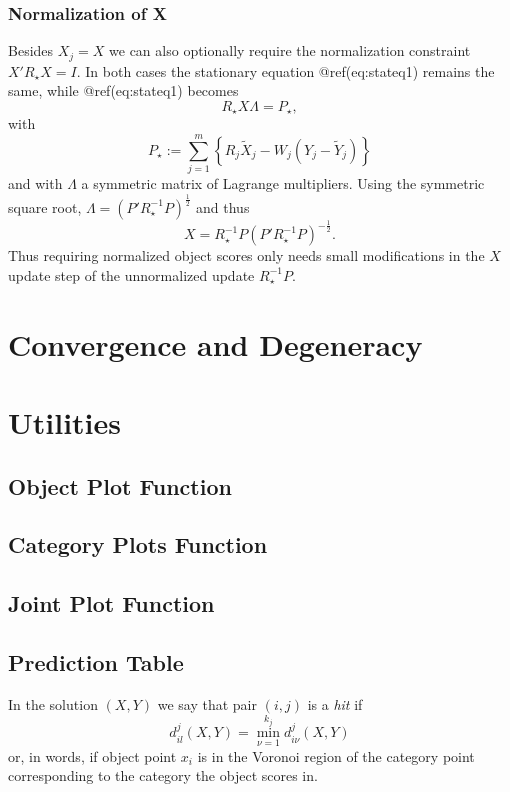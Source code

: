 \documentclass[
  12pt,
  letterpaper,
  DIV=11,
  numbers=noendperiod]{scrartcl}
\begin{document}
\subsubsection{Normalization of X}\label{normalization-of-x}

Besides \(X_j=X\) we can also optionally require the normalization
constraint \(X'R_\star X=I\). In both cases the stationary equation
@ref(eq:stateq1) remains the same, while @ref(eq:stateq1) becomes \[
R_\star X\Lambda=P_\star,
\] with \[
P_\star:=\sum_{j=1}^m\left\{R_j\tilde X_j-W_j(Y_j-\tilde Y_j)\right\}
\] and with \(\Lambda\) a symmetric matrix of Lagrange multipliers.
Using the symmetric square root, \(\Lambda=(P'R_\star^{-1}P)^\frac12\)
and thus \[
X=R_\star^{-1}P(P'R_\star^{-1}P)^{-\frac12}.
\] Thus requiring normalized object scores only needs small
modifications in the \(X\) update step of the unnormalized update
\(R_\star^{-1}P\).

\section{Convergence and Degeneracy}\label{convergence-and-degeneracy}

\section{Utilities}\label{utilities}

\subsection{Object Plot Function}\label{object-plot-function}

\subsection{Category Plots Function}\label{category-plots-function}

\subsection{Joint Plot Function}\label{joint-plot-function}

\subsection{Prediction Table}\label{prediction-table}

In the solution \((X,Y)\) we say that pair \((i,j)\) is a \emph{hit} if
\[
d_{il}^j(X,Y)=\min_{\nu=1}^{k_j}d_{i\nu}^j(X,Y)
\] or, in words, if object point \(x_i\) is in the Voronoi region of the
category point corresponding to the category the object scores in.
\end{document}
